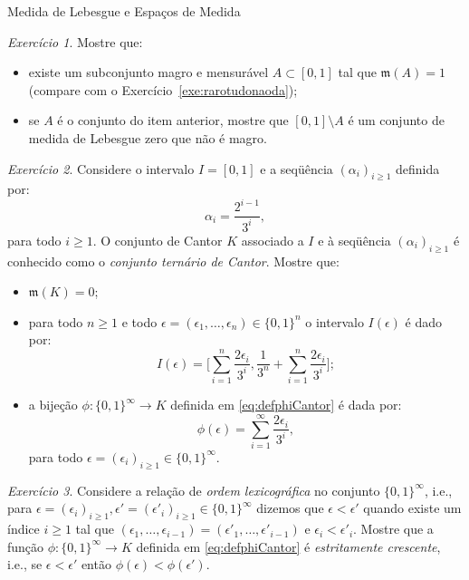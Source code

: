 \documentclass[oneside,final,11pt]{amsbook}
\newcommand{\leb}{\mathfrak m}
\theoremstyle{remark}\newtheorem{exercise}{Exercício}[chapter]
\theoremstyle{remark}\newtheorem{*exercise}[exercise]{\hbox to 0pt{\hskip 0pt minus 1fil*}Exercício}
\theoremstyle{definition}\newtheorem{exdefin}{Definição}[chapter]
\theoremstyle{plain}\newtheorem{teo}{Teorema}[section]
\theoremstyle{plain}\newtheorem{lem}[teo]{Lema}
\theoremstyle{plain}\newtheorem{prop}[teo]{Proposição}
\theoremstyle{plain}\newtheorem{cor}[teo]{Corolário}
\theoremstyle{definition}\newtheorem{defin}[teo]{Definição}
\theoremstyle{remark}\newtheorem{rem}[teo]{Observação}
\theoremstyle{definition}\newtheorem{notation}[teo]{Notação}
\theoremstyle{definition}\newtheorem{convention}[teo]{Convenção}
\theoremstyle{definition}\newtheorem{example}[teo]{Exemplo}
\numberwithin{section}{chapter}
\numberwithin{equation}{section}
\begin{document}
\begin{chapter}{Medida de Lebesgue e Espaços de Medida}
\begin{exercise}
Mostre que:
\begin{itemize}
\item existe um subconjunto magro e mensurável $A\subset[0,1]$ tal que $\leb(A)=1$
(compare com o Exercício~\ref{exe:rarotudonaoda});
\item se $A$ é o conjunto do item anterior, mostre que $[0,1]\setminus A$ é um conjunto
de medida de Lebesgue zero que não é magro.
\end{itemize}
\end{exercise}

\begin{exercise}
Considere o intervalo $I=[0,1]$ e a seqüência $(\alpha_i)_{i\ge1}$ definida por:
\[\alpha_i=\frac{2^{i-1}}{3^i},\]
para todo $i\ge1$. O conjunto de Cantor $K$ associado a $I$ e à seqüência $(\alpha_i)_{i\ge1}$ é conhecido como o
{\em conjunto ternário de Cantor}.
Mostre que:
\begin{itemize}
\item $\leb(K)=0$;
\item para todo $n\ge1$ e todo $\epsilon=(\epsilon_1,\ldots,\epsilon_n)\in\{0,1\}^n$
o intervalo $I(\epsilon)$ é dado por:
\[I(\epsilon)=\Big[\sum_{i=1}^n\frac{2\epsilon_i}{3^i},\frac1{3^n}+\sum_{i=1}^n\frac{2\epsilon_i}{3^i}\Big];\]
\item a bijeção $\phi:\{0,1\}^\infty\to K$ definida em \eqref{eq:defphiCantor} é dada por:
\[\phi(\epsilon)=\sum_{i=1}^\infty\frac{2\epsilon_i}{3^i},\]
para todo $\epsilon=(\epsilon_i)_{i\ge1}\in\{0,1\}^\infty$.
\end{itemize}
\end{exercise}

\begin{exercise}
Considere a relação de {\em ordem lexicográfica\/}
no conjunto $\{0,1\}^\infty$, i.e.,
para $\epsilon=(\epsilon_i)_{i\ge1},\epsilon'=(\epsilon'_i)_{i\ge1}\in\{0,1\}^\infty$ dizemos
que $\epsilon<\epsilon'$ quando existe um índice $i\ge1$
tal que $(\epsilon_1,\ldots,\epsilon_{i-1})=(\epsilon'_1,\ldots,\epsilon'_{i-1})$
e $\epsilon_i<\epsilon'_i$. Mostre que a função $\phi:\{0,1\}^\infty\to K$ definida em
\eqref{eq:defphiCantor} é {\em estritamente crescente},
i.e., se $\epsilon<\epsilon'$ então $\phi(\epsilon)<\phi(\epsilon')$.
\end{exercise}


\end{chapter}
\end{document}
